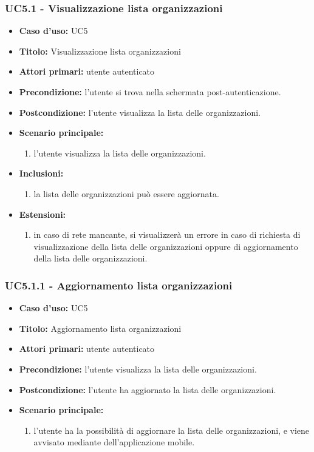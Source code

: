 \documentclass[casi-duso]{subfiles}
\begin{document}
\subsubsection{UC5.1 - Visualizzazione lista organizzazioni}
\label{subsub:uc5utente}
\begin{itemize}
  \item \textbf{Caso d’uso:} UC5 
  \item \textbf{Titolo:} Visualizzazione lista organizzazioni
  \item \textbf{Attori primari:} utente autenticato
  \item \textbf{Precondizione:} l'utente si trova nella schermata post-autenticazione.
  \item \textbf{Postcondizione:} l'utente visualizza la lista delle organizzazioni.
  \item \textbf{Scenario principale:} 
  \begin{enumerate}
    \item l'utente visualizza la lista delle organizzazioni.
  \end{enumerate}  
  \item \textbf{Inclusioni:} 
  \begin{enumerate}
    \item la lista delle organizzazioni può essere aggiornata.
  \end{enumerate}
  \item \textbf{Estensioni:} 
  \begin{enumerate}
    \item in caso di rete mancante, si visualizzerà un errore in caso di richiesta di visualizzazione della lista delle organizzazioni
    oppure di aggiornamento della lista delle organizzazioni.
  \end{enumerate}  
\end{itemize}

\subsubsection{UC5.1.1 - Aggiornamento lista organizzazioni}
\label{subsub:uc5utente}
\begin{itemize}
  \item \textbf{Caso d’uso:} UC5 
  \item \textbf{Titolo:} Aggiornamento lista organizzazioni
  \item \textbf{Attori primari:} utente autenticato
  \item \textbf{Precondizione:} l'utente visualizza la lista delle organizzazioni.
  \item \textbf{Postcondizione:} l'utente ha aggiornato la lista delle organizzazioni.
  \item \textbf{Scenario principale:} 
  \begin{enumerate}
    \item l'utente ha la possibilità di aggiornare la lista delle organizzazioni, e viene avvisato mediante  
    dell'applicazione mobile.
  \end{enumerate}  
\end{itemize}
\end{document}
